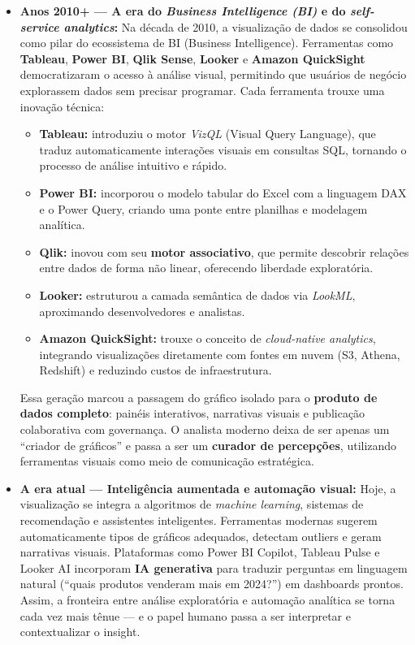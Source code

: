 \begin{itemize}[leftmargin=*]
  \item \textbf{Anos 2010+ — A era do \textit{Business Intelligence (BI)} e do \textit{self-service analytics}:}  
  Na década de 2010, a visualização de dados se consolidou como pilar do ecossistema de BI (Business Intelligence). Ferramentas como \textbf{Tableau}, \textbf{Power BI}, \textbf{Qlik Sense}, \textbf{Looker} e \textbf{Amazon QuickSight} democratizaram o acesso à análise visual, permitindo que usuários de negócio explorassem dados sem precisar programar.  
  Cada ferramenta trouxe uma inovação técnica:
  \begin{itemize}
    \item \textbf{Tableau:} introduziu o motor \textit{VizQL} (Visual Query Language), que traduz automaticamente interações visuais em consultas SQL, tornando o processo de análise intuitivo e rápido.
    \item \textbf{Power BI:} incorporou o modelo tabular do Excel com a linguagem DAX e o Power Query, criando uma ponte entre planilhas e modelagem analítica.
    \item \textbf{Qlik:} inovou com seu \textbf{motor associativo}, que permite descobrir relações entre dados de forma não linear, oferecendo liberdade exploratória.
    \item \textbf{Looker:} estruturou a camada semântica de dados via \textit{LookML}, aproximando desenvolvedores e analistas.
    \item \textbf{Amazon QuickSight:} trouxe o conceito de \textit{cloud-native analytics}, integrando visualizações diretamente com fontes em nuvem (S3, Athena, Redshift) e reduzindo custos de infraestrutura.
  \end{itemize}
  Essa geração marcou a passagem do gráfico isolado para o \textbf{produto de dados completo}: painéis interativos, narrativas visuais e publicação colaborativa com governança.  
  O analista moderno deixa de ser apenas um “criador de gráficos” e passa a ser um \textbf{curador de percepções}, utilizando ferramentas visuais como meio de comunicação estratégica.

  \item \textbf{A era atual — Inteligência aumentada e automação visual:}  
  Hoje, a visualização se integra a algoritmos de \textit{machine learning}, sistemas de recomendação e assistentes inteligentes. Ferramentas modernas sugerem automaticamente tipos de gráficos adequados, detectam outliers e geram narrativas visuais.  
  Plataformas como Power BI Copilot, Tableau Pulse e Looker AI incorporam \textbf{IA generativa} para traduzir perguntas em linguagem natural (“quais produtos venderam mais em 2024?”) em dashboards prontos.  
  Assim, a fronteira entre análise exploratória e automação analítica se torna cada vez mais tênue — e o papel humano passa a ser interpretar e contextualizar o insight.
\end{itemize}

